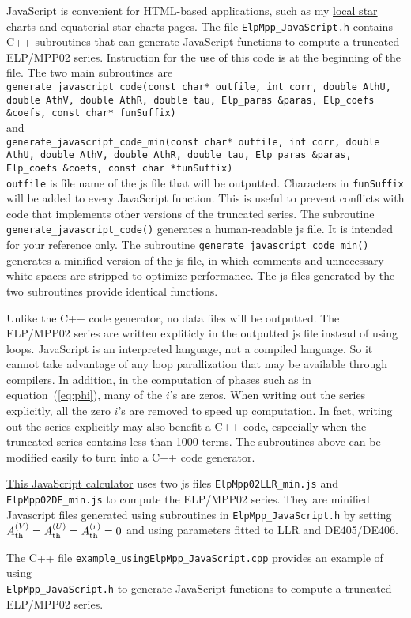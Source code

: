\documentclass[12pt]{article}
\begin{document}
JavaScript is convenient for HTML-based applications, such as my
\href{https://ytliu0.github.io/starCharts/}{local star charts} and 
\href{https://ytliu0.github.io/starCharts/chartGCRS_min.html}{equatorial star 
charts} pages. The file 
{\tt ElpMpp\_JavaScript.h} contains C++ subroutines that can 
generate JavaScript functions to compute a truncated ELP/MPP02 series. 
Instruction for the use of this code is at the beginning of the file. 
The two main subroutines are \\
{\tt generate\_javascript\_code(const char* outfile, int corr,
                       double AthU, double AthV, double AthR, double tau,
                       Elp\_paras \&paras, Elp\_coefs \&coefs, const char* funSuffix)} \\
and \\
{\tt generate\_javascript\_code\_min(const char* outfile, int corr,
                       double AthU, double AthV, double AthR, double tau,
                       Elp\_paras \&paras, Elp\_coefs \&coefs, const char *funSuffix)}\\
{\tt outfile} is file name of the js file that will be outputted. 
Characters in {\tt funSuffix} will be added to every JavaScript function. 
This is useful to prevent conflicts with code that implements other versions 
of the truncated series. The subroutine {\tt generate\_javascript\_code()} 
generates a human-readable js file. It is intended for your reference only. The 
subroutine {\tt generate\_javascript\_code\_min()} generates a minified 
version of the js file, in which comments and unnecessary white spaces are 
stripped to optimize performance. The js files generated by the two subroutines 
provide identical functions. 

Unlike the C++ code generator, no data files will be outputted. The ELP/MPP02 
series are written expliticly in the outputted js file instead of using loops. 
JavaScript is an interpreted language, not a compiled language. So it cannot 
take advantage of any loop parallization that may be available through compilers.
In addition, in the computation of phases such as 
in equation~(\ref{eq:phi}), many of the $i$'s are zeros. When writing out the series 
explicitly, all the zero $i$'s are removed to speed up computation. In fact, 
writing out the series explicitly may also benefit a C++ code, especially when the 
truncated series contains less than 1000 terms. The subroutines above can be 
modified easily to turn into a C++ code generator.

\href{https://github.com/ytliu0/ElpMpp02/ElpMpp02.html}{This JavaScript calculator} 
uses two js files {\tt ElpMpp02LLR\_min.js} and {\tt ElpMpp02DE\_min.js} to 
compute the ELP/MPP02 series. They are minified Javascript files generated using 
subroutines in {\tt ElpMpp\_JavaScript.h} by setting $A_{\rm th}^{(V)} = A_{\rm th}^{(U)}
= A_{\rm th}^{(r)} = 0$ and using parameters fitted to LLR and DE405/DE406.

The C++ file {\tt example\_usingElpMpp\_JavaScript.cpp} provides an example 
of using \\ {\tt ElpMpp\_JavaScript.h} to generate JavaScript functions to compute
a truncated ELP/MPP02 series.
\end{document}
